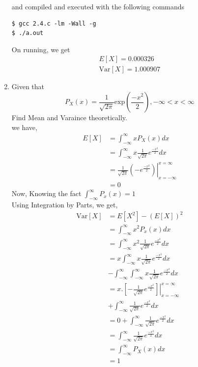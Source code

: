 \documentclass[journal,12pt,twocolumn]{IEEEtran}
\renewcommand\thesection{\arabic{section}}
\begin{document}
\begin{enumerate}[label=\thesection.\arabic*.,ref=\thesection.\theenumi]
and compiled and executed with the following commands

\begin{lstlisting}
$ gcc 2.4.c -lm -Wall -g
$ ./a.out
\end{lstlisting} 

On running, we get
    \begin{align}
        E[X] = 0.000326 \\
        \text{Var}[X] = 1.000907
    \end{align}


    \item Given that
     \begin{equation}
        P_X(x) = \frac{1}{\sqrt{2\pi}}\text{exp}\left(\frac{-x^2}{2}\right), -\infty < x < \infty
     \end{equation}
     Find Mean and Varaince theoretically.\\
     \solution we have,
     \begin{align}
        E[X] &= \int_{-\infty}^{\infty}xP_X(x)dx \\
        &= \int_{-\infty}^{\infty}x\frac{1}{\sqrt{2\pi}}e^{\frac{-x^2}{2}}dx \\
        &=\left. \frac{1}{\sqrt{2\pi}}(-e^{\frac{-x^2}{2}}) \right|_{x=-\infty}^{x=\infty}\\
        &=0
     \end{align}
     Now, Knowing the fact $\int_{-\infty}^{\infty} P_x(x) = 1$ \\ Using Integration by Parts, we get,
     \begin{align}
        \text{Var}[X]&=E[X^2]-(E[X])^2 \\
        &=\int_{-\infty}^{\infty}x^2P_x(x)dx \\
        &=\int_{-\infty}^{\infty}x^2\frac{1}{\sqrt{2\pi}}e^{\frac{-x^2}{2}}dx \\
        &=x\int_{-\infty}^{\infty}x\frac{1}{\sqrt{2\pi}}e^{\frac{-x^2}{2}}dx \\ &- \int_{-\infty}^{\infty}\int_{-\infty}^{\infty}x\frac{1}{\sqrt{2\pi}}e^{\frac{-x^2}{2}}dx \\
        &=\left. x.[-\frac{1}{\sqrt{2\pi}}e^{\frac{-x^2}{2}}]\right|_{x=-\infty}^{x=\infty} \\
        &+ \int_{-\infty}^{\infty}\frac{1}{\sqrt{2\pi}}e^{\frac{-x^2}{2}}dx \\
        &=0+\int_{-\infty}^{\infty}\frac{1}{\sqrt{2\pi}}e^{\frac{-x^2}{2}}dx\\
        &=\int_{-\infty}^{\infty}\frac{1}{\sqrt{2\pi}}e^{\frac{-x^2}{2}}dx\\
        &=\int_{-\infty}^{\infty}P_X(x)dx\\
        &=1
     \end{align}
\end{enumerate}
\end{document}
